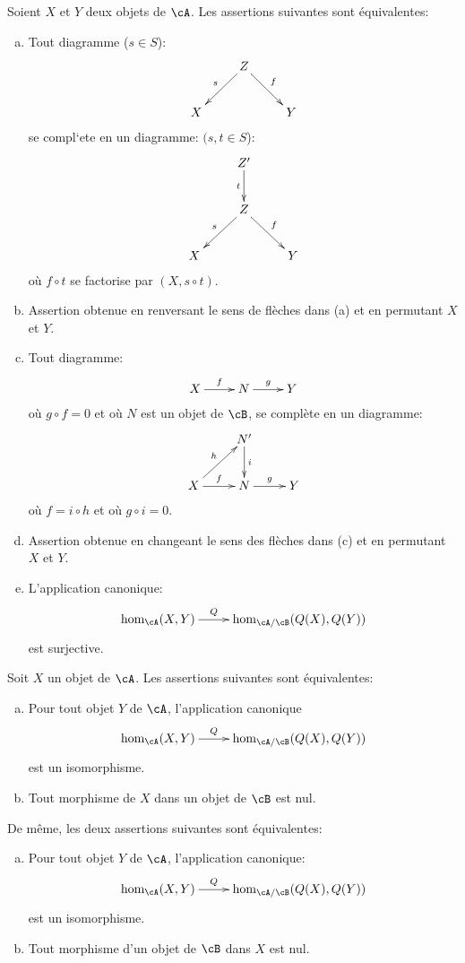 \begin{proposition}\label{VIII:2-5-2}
Soient $X$ et $Y$ deux objets de $\cA$. Les assertions suivantes sont 
équivalentes: 
\begin{enumerate}[(a)]
  \item Tout diagramme ($s\in S$): 
    \[\xymatrix{
      & Z \ar[dl]_-s \ar[dr]^-f \\
      X 
        & & Y 
    }\]
    se compl`ete en un diagramme: $(s,t\in S$): 
    \[\xymatrix{
      & Z' \ar[d]_-t \\
      & Z \ar[dl]_-s \ar[dr]^-f \\
      X 
        & & Y 
    }\]
    où $f\circ t$ se factorise par $(X,s\circ t)$. 
  \item Assertion obtenue en renversant le sens de flèches dans (a) et en 
    permutant $X$ et $Y$. 
  \item Tout diagramme: 
    \[\xymatrix{
      X \ar[r]^-f 
        & N \ar[r]^-g 
        & Y 
    }\]
    où $g\circ f=0$ et où $N$ est un objet de $\cB$, se complète en un 
    diagramme: 
    \[\xymatrix{
      & N' \ar[d]^-i \\
      X \ar[ur]^-h \ar[r]^-f 
        & N \ar[r]^-g 
        & Y 
    }\]
    où $f=i\circ h$ et où $g\circ i=0$. 
  \item Assertion obtenue en changeant le sens des flèches dans (c) et en 
    permutant $X$ et $Y$. 
  \item L'application canonique: 
    \[\xymatrix{
      \hom_\cA(X,Y) \ar[r]^-Q 
        & \hom_{\cA/\cB}(Q(X),Q(Y)) 
    }\]
    est surjective. 
\end{enumerate}
\end{proposition}





\begin{proposition}\label{VIII:2-5-3}
Soit $X$ un objet de $\cA$. Les assertions suivantes sont équivalentes: 
\begin{enumerate}[(a)]
  \item Pour tout objet $Y$ de $\cA$, l'application canonique 
    \[\xymatrix{
      \hom_\cA(X,Y) \ar[r]^-Q 
        & \hom_{\cA/\cB}(Q(X),Q(Y)) 
    }\]
    est un isomorphisme. 
  \item Tout morphisme de $X$ dans un objet de $\cB$ est nul. 
\end{enumerate}
De même, les deux assertions suivantes sont équivalentes: 
\begin{enumerate}[(a)']
  \item Pour tout objet $Y$ de $\cA$, l'application canonique: 
    \[\xymatrix{
      \hom_\cA(X,Y) \ar[r]^-Q 
        & \hom_{\cA/\cB}(Q(X),Q(Y)) 
    }\]
    est un isomorphisme. 
  \item Tout morphisme d'un objet de $\cB$ dans $X$ est nul. 
\end{enumerate}
\end{proposition}





